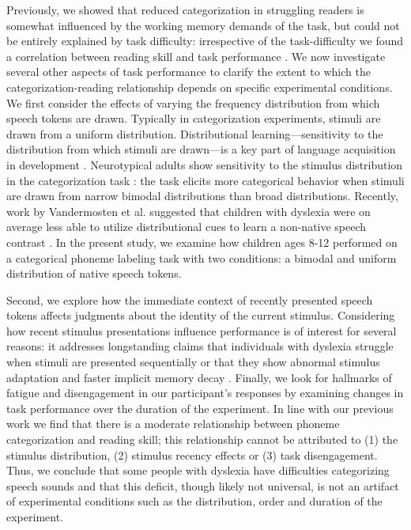 \documentclass[../uwthesis.tex]{subfiles}
\begin{document}
Previously, we showed that reduced categorization in struggling readers is somewhat influenced by the working memory demands of the task, but could not be entirely explained by task difficulty: irrespective of the task-difficulty we found a correlation between reading skill and task performance \citep{OBrien2018}. We now investigate several other aspects of task performance to clarify the extent to which the categorization-reading relationship depends on specific experimental conditions. We first consider the effects of varying the frequency distribution from which speech tokens are drawn. Typically in categorization experiments, stimuli are drawn from a uniform distribution. Distributional learning---sensitivity to the distribution from which stimuli are drawn---is a key part of language acquisition in development \citep{Maye2002InfantDiscrimination}. Neurotypical adults show sensitivity to the stimulus distribution in the categorization task \citep{Clayards2008PerceptionCues}: the task elicits more categorical behavior when stimuli are drawn from narrow bimodal distributions than broad distributions. Recently, work by Vandermosten et al. suggested that children with dyslexia were on average less able to utilize distributional cues to learn a non-native speech contrast \citep{Vandermosten2018StatisticalChildren}. In the present study, we examine how children ages 8-12 performed on a categorical phoneme labeling task with two conditions: a bimodal and uniform distribution of native speech tokens.

Second, we explore how the immediate context of recently presented speech tokens affects judgments about the identity of the current stimulus. Considering how recent stimulus presentations influence performance is of interest for several reasons: it addresses longstanding claims that individuals with dyslexia struggle when stimuli are presented sequentially \citep{Tallal1980} or that they show abnormal stimulus adaptation and faster implicit memory decay \citep{Jaffe-Dax2017DyslexicsAdaptation,Perrachione2016DysfunctionDyslexia,Ahissar2006}. Finally, we look for hallmarks of fatigue and disengagement in our participant's responses by examining changes in task performance over the duration of the experiment. In line with our previous work we find that there is a moderate relationship between phoneme categorization and reading skill; this relationship cannot be attributed to (1) the stimulus distribution, (2) stimulus recency effects or (3) task disengagement. Thus, we conclude that some people with dyslexia have difficulties categorizing speech sounds and that this deficit, though likely not universal, is not an artifact of experimental conditions such as the distribution, order and duration of the experiment.
\end{document}
